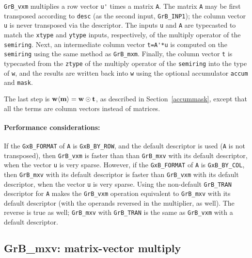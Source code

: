 \documentclass[12pt]{article}
\begin{document}
{\verb'GrB_vxm' multiplies a row vector \verb"u'" times a matrix \verb'A'.  The
matrix \verb'A' may be first transposed according to \verb'desc' (as the second
input, \verb'GrB_INP1'); the column vector \verb'u' is never transposed via the
descriptor.  The inputs \verb'u' and \verb'A' are typecasted to match the
\verb'xtype' and \verb'ytype' inputs, respectively, of the multiply operator of
the \verb'semiring'.  Next, an intermediate column vector \verb"t=A'*u" is
computed on the \verb'semiring' using the same method as \verb'GrB_mxm'.
Finally, the column vector \verb't' is typecasted from the \verb'ztype' of the
multiply operator of the \verb'semiring' into the type of \verb'w', and the
results are written back into \verb'w' using the optional accumulator
\verb'accum' and \verb'mask'.

The last step is ${\bf w \langle m \rangle  = w \odot t}$, as described
in Section~\ref{accummask}, except that all the
terms are column vectors instead of matrices.

\paragraph{\bf Performance considerations:} %
If the \verb'GxB_FORMAT' of \verb'A' is \verb'GxB_BY_ROW', and the default
descriptor is used (\verb'A' is not transposed), then \verb'GrB_vxm' is faster
than than \verb'GrB_mxv' with its default descriptor, when the vector \verb'u'
is very sparse.
However, if the \verb'GxB_FORMAT' of \verb'A' is \verb'GxB_BY_COL', then
\verb'GrB_mxv' with its default descriptor is faster than \verb'GrB_vxm' with
its default descriptor, when the vector \verb'u' is very sparse.
Using the non-default \verb'GrB_TRAN' descriptor for \verb'A' makes the
\verb'GrB_vxm' operation equivalent to \verb'GrB_mxv' with its default
descriptor (with the operands reversed in the multiplier, as well).  The
reverse is true as well; \verb'GrB_mxv' with \verb'GrB_TRAN' is the same as
\verb'GrB_vxm' with a default descriptor.

\newpage
\subsection{{\sf GrB\_mxv:} matrix-vector multiply} %
\label{mxv}

}
\end{document}
